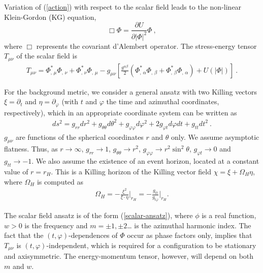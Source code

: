 Variation of (\ref{action}) with respect to the scalar field
leads to the non-linear Klein-Gordon (KG) equation,
\begin{equation}
\label{KG}
 \Box\Phi= \frac{\partial U}{\partial\left|\Phi\right|^2}\Phi \ ,
\end{equation}
where $\Box$ represents the covariant d'Alembert operator.
%
%
The stress-energy tensor $T_{\mu\nu}$ of the scalar field is
\begin{eqnarray}
T_{\mu \nu} 
=  \Phi_{, \, \mu}^*\Phi_{, \, \nu}
+\Phi_{, \, \nu}^*\Phi_{, \, \mu} -g_{\mu\nu} \left[ \frac{g^{\alpha\beta} }{2} 
\left( \Phi_{, \, \alpha}^*\Phi_{, \, \beta}+
\Phi_{, \, \beta}^*\Phi_{, \, \alpha} \right)+U(|\Phi|)\right]
 \ .
\label{tmunu} 
\end{eqnarray}




For the background metric,
we consider a general 
ansatz with two Killing vectors   $\xi=\partial_t$ and $\eta=\partial_\varphi$ (with $t$ and $\varphi$
the time and azimuthal coordinates, respectively),
which in an appropriate coordinate system
can be written as
\begin{eqnarray}
\label{metric-ansatz}
ds^2= g_{rr}dr^2+g_{\theta \theta} d\theta^2 +g_{\varphi\varphi}d\varphi^2+2 g_{\varphi t}d\varphi dt +g_{tt} dt^2 \ .
\end{eqnarray}
$g_{\mu\nu}$ 
are functions of the spherical coordinates $r$ and $\theta$ only. We assume asymptotic flatness. Thus, as $r\to \infty$, $g_{rr} \to 1$,
$g_{\theta \theta} \to r^2$,
$g_{\varphi\varphi} \to r^2\sin^2 \theta$,
$g_{\varphi t} \to 0$
and
$g_{tt} \to -1$.
We also assume the existence of an event horizon, located
at a constant value of $r=r_H$.
This 
is a Killing horizon of the Killing vector field
$\chi=\xi+\Omega_H \eta$,
where $\Omega_H$ is computed as
\begin{eqnarray}
\label{OmegaH}
\Omega_H=-\frac{\xi^2}{\xi \cdot \eta}\bigg |_{r_H}=-\frac{g_{tt}}{g_{t\varphi}}\bigg |_{r_H}.
\end{eqnarray}

The scalar field ansatz is of the form (\ref{scalar-ansatz}), 
 where $\phi$ is a real function, $w>0$ is the frequency and $m=\pm 1,\pm 2$\dots
is the azimuthal harmonic index. 
The fact
that the $(t, \varphi)$-dependences of $\Phi$  occur as phase factors only,
implies that $T_{\mu\nu}$ is $(t, \varphi)$-independent, which is required for
a configuration to be stationary and axisymmetric.
The energy-momentum tensor, however,  will 
 depend on both $m$ and $w$.

